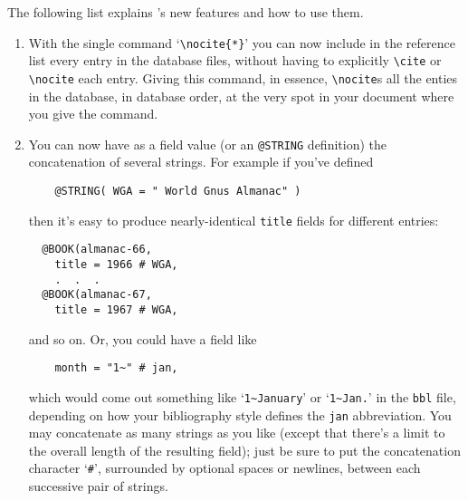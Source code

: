 The following list explains \BibTeX's new features and how to use them.
\begin{enumerate}

\item
With the single command `\hbox{\verb|\nocite{*}|}'
you can now include in the reference list
every entry in the database files, without having to explicitly
\verb|\cite| or \hbox{\verb|\nocite|} each entry.
Giving this command, in essence,
\hbox{\verb|\nocite|}s
all the enties in the database, in database order,
at the very spot in your document
where you give the command.

\item
\label{concat}
You can now have as a field value (or an {\tt @STRING} definition)
the concatenation of several strings.
For example if you've defined
\begin{verbatim}
    @STRING( WGA = " World Gnus Almanac" )
\end{verbatim}
then it's easy to produce nearly-identical
{\tt title} fields for different entries:
\begin{verbatim}
  @BOOK(almanac-66,
    title = 1966 # WGA,
    .  .  .
  @BOOK(almanac-67,
    title = 1967 # WGA,
\end{verbatim}
and so on.  Or, you could have a field like
\begin{verbatim}
    month = "1~" # jan,
\end{verbatim}
which would come out something like
`\hbox{\verb|1~January|}' or `\hbox{\verb|1~Jan.|}' in the {\tt bbl} file,
depending on how your bibliography style defines
the {\tt jan} abbreviation.
You may concatenate as many strings as you like
(except that there's a limit to the overall length
of the resulting field);
just be sure to put the concatenation character `{\tt\#}'$\!$,
surrounded by optional spaces or newlines,
between each successive pair of strings.


\end{enumerate}
